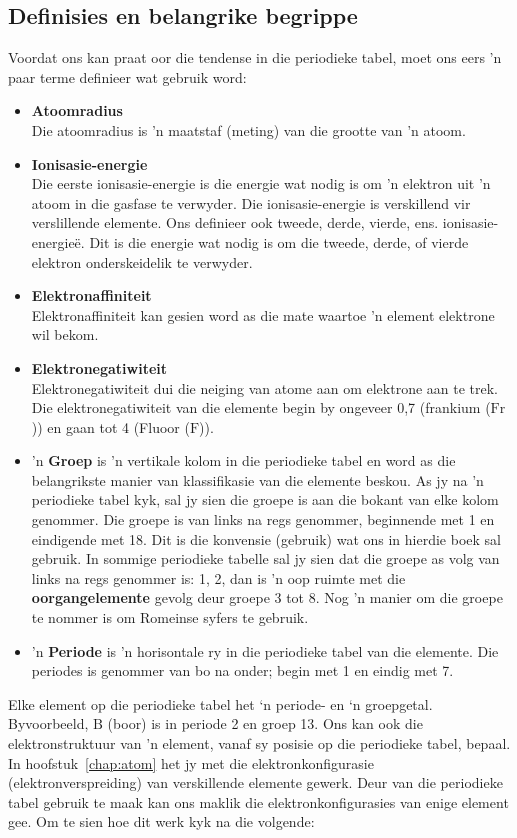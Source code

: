 \subsection*{Definisies en belangrike begrippe}
Voordat ons kan praat oor die tendense in die periodieke tabel, moet ons eers 'n paar terme definieer wat gebruik word:
\begin{itemize}[noitemsep]
\item \textbf{Atoomradius} \\
Die atoomradius is 'n maatstaf (meting) van die grootte van 'n atoom. 
\item \textbf{Ionisasie-energie}\\
Die eerste ionisasie-energie is die energie wat nodig is om 'n elektron uit 'n atoom in die gasfase te verwyder. Die ionisasie-energie is verskillend vir verslillende elemente. Ons definieer ook tweede, derde, vierde, ens. ionisasie-energie\"{e}. Dit is die energie wat nodig is om die tweede, derde, of vierde elektron onderskeidelik te verwyder. 
\item \textbf{Elektronaffiniteit}\\
Elektronaffiniteit kan gesien word as die mate waartoe 'n element elektrone wil bekom.
\item \textbf{Elektronegatiwiteit}\\
Elektronegatiwiteit dui die neiging van atome aan om elektrone aan te trek. Die elektronegatiwiteit van die elemente begin by ongeveer 0,7 (frankium ($\text{Fr}$)) en gaan tot 4 (Fluoor ($\text{F}$)).
\item 'n \textbf{Groep} is 'n vertikale kolom in die periodieke tabel en word as die belangrikste manier van klassifikasie van die elemente beskou. As jy na 'n periodieke tabel kyk, sal jy sien die groepe is aan die bokant van elke kolom genommer. Die groepe is van links na regs genommer, beginnende met 1 en eindigende met 18. Dit is die konvensie (gebruik) wat ons in hierdie boek sal gebruik. In sommige periodieke tabelle sal jy sien dat die groepe as volg van links na regs genommer is: 1, 2, dan is 'n oop ruimte met die \textbf{oorgangelemente} gevolg deur groepe 3 tot 8. Nog 'n manier om die groepe te nommer  is om Romeinse syfers te gebruik.
\item 'n \textbf{Periode} is 'n horisontale ry in die periodieke tabel van die elemente. Die periodes is genommer van bo na onder; begin met 1 en eindig met 7.
\end{itemize}
Elke element op die periodieke tabel het ‘n periode- en ‘n groepgetal. Byvoorbeeld, $\text{B}$ (boor) is in periode 2 en groep 13. Ons kan ook die elektronstruktuur van 'n element, vanaf sy posisie op die periodieke tabel, bepaal. In hoofstuk~\ref{chap:atom} het jy met die elektronkonfigurasie (elektronverspreiding) van verskillende elemente gewerk. Deur van die periodieke tabel gebruik te maak kan ons maklik die elektronkonfigurasies van enige element gee. Om te sien hoe dit werk kyk na die volgende:\\
